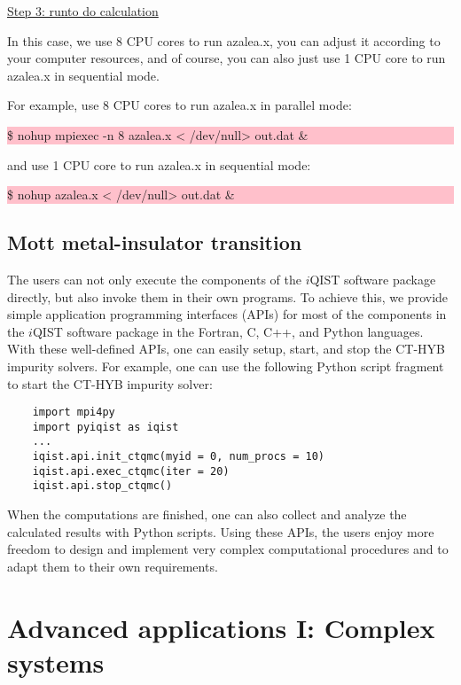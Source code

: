\underline{Step 3: run\azalea to do calculation}

In this case, we use 8 CPU cores to run azalea.x, you can adjust it according to your computer resources, and of course, you can also just use 1 CPU core to run azalea.x in sequential mode.

For example, use 8 CPU cores to run azalea.x in parallel mode:

\noindent\colorbox{pink}{\parbox[r]{\linewidth}{\quad \$ nohup mpiexec -n 8 azalea.x < /dev/null> out.dat &}}

and use 1 CPU core to run azalea.x in sequential mode:

\noindent\colorbox{pink}{\parbox[r]{\linewidth}{\quad \$ nohup azalea.x < /dev/null> out.dat &}}


\subsection{Mott metal-insulator transition}
The users can not only execute the components of the $i$QIST software package directly, but also invoke them in their own programs. To achieve this, we provide simple application programming interfaces (APIs) for most of the components in the $i$QIST software package in the Fortran, C, C++, and Python languages. With these well-defined APIs, one can easily setup, start, and stop the CT-HYB impurity solvers. For example, one can use the following Python script fragment to start the CT-HYB impurity solver:
\begin{verbatim}
    import mpi4py
    import pyiqist as iqist
    ...
    iqist.api.init_ctqmc(myid = 0, num_procs = 10)
    iqist.api.exec_ctqmc(iter = 20)
    iqist.api.stop_ctqmc()
\end{verbatim}
When the computations are finished, one can also collect and analyze the calculated results with Python scripts. Using these APIs, the users enjoy more freedom to design and implement very complex computational procedures and to adapt them to their own requirements.

\section{Advanced applications I: Complex systems}
